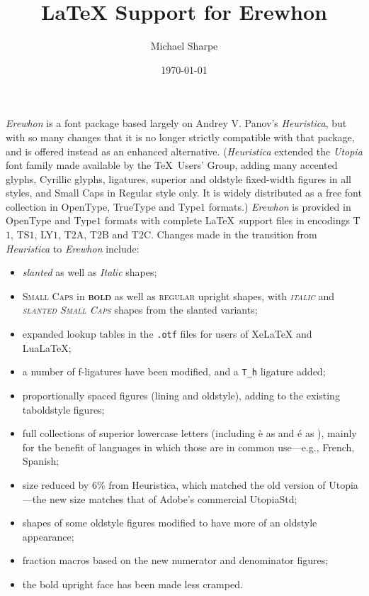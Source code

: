 \documentclass[11pt]{amsart}
\title{LaTeX Support for Erewhon}
\author{Michael Sharpe}
\date{\today}  %
\begin{document}
\maketitle
\emph{Erewhon} is a font package based largely on Andrey V. Panov's \emph{Heuristica}, but with so many changes that it is no longer strictly compatible with that package, and is offered instead as an enhanced alternative. (\emph{Heuristica}  extended the \emph{Utopia} font family made available by the \TeX\ Users' Group, adding many accented glyphs, Cyrillic glyphs, ligatures, superior and oldstyle fixed-width figures in all styles, and Small Caps in Regular style only. It is widely distributed as a free font collection in OpenType, TrueType and Type$1$ formats.) \emph{Erewhon} is provided in OpenType and Type$1$ formats with complete \LaTeX\ support files in encodings T$1$, TS$1$, LY$1$, T$2$A, T$2$B and T$2$C.  Changes made in the transition from \emph{Heuristica} to \emph{Erewhon} include:
\begin{itemize}
\item
\textsl{slanted} as well as \textit{Italic} shapes;
\item
\textsc{Small Caps} in \textsc{\textbf{bold}} as well as \textsc{regular} upright shapes, with \textsc{\textit{italic}} and \textsc{\textsl{slanted  Small Caps}} shapes from the slanted variants;
\item expanded lookup tables in the {\tt.otf} files for users of XeLaTeX and LuaLaTeX;
\item a number of f-ligatures have been modified, and a \verb|T_h| ligature added;
\item proportionally spaced figures (lining and oldstyle), adding to the existing taboldstyle figures;
\item full collections of superior lowercase letters (including \`e as  and \'e as ), mainly for the benefit of languages in which those are in common use---e.g., French, Spanish;
\item size reduced by 6\% from Heuristica, which matched the old version of Utopia---the new size matches that of Adobe's commercial UtopiaStd;
\item shapes of some oldstyle figures modified to have more of an oldstyle appearance;
\item fraction macros based on the new numerator and denominator figures;
\item the bold upright face has been made less cramped.
\end{itemize}
\end{document}
